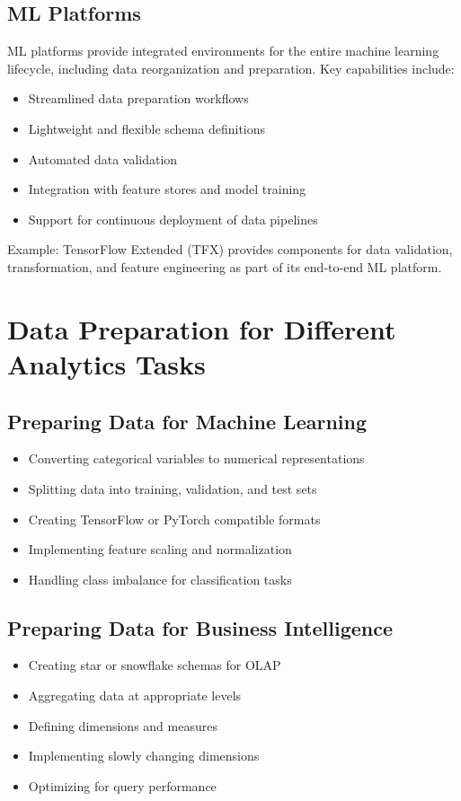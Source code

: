 \documentclass[12pt]{article}
\begin{document}
\subsection{ML Platforms}
\begin{tcolorbox}[colback=yellow!5!white,colframe=yellow!75!black,title={ML Platforms}]
ML platforms provide integrated environments for the entire machine learning lifecycle, including data reorganization and preparation. Key capabilities include:

\begin{itemize}
    \item Streamlined data preparation workflows
    \item Lightweight and flexible schema definitions
    \item Automated data validation
    \item Integration with feature stores and model training
    \item Support for continuous deployment of data pipelines
\end{itemize}

Example: TensorFlow Extended (TFX) provides components for data validation, transformation, and feature engineering as part of its end-to-end ML platform.
\end{tcolorbox}

\section{Data Preparation for Different Analytics Tasks}

\subsection{Preparing Data for Machine Learning}
\begin{itemize}
    \item Converting categorical variables to numerical representations
    \item Splitting data into training, validation, and test sets
    \item Creating TensorFlow or PyTorch compatible formats
    \item Implementing feature scaling and normalization
    \item Handling class imbalance for classification tasks
\end{itemize}

\subsection{Preparing Data for Business Intelligence}
\begin{itemize}
    \item Creating star or snowflake schemas for OLAP
    \item Aggregating data at appropriate levels
    \item Defining dimensions and measures
    \item Implementing slowly changing dimensions
    \item Optimizing for query performance
\end{itemize}
\end{document}
